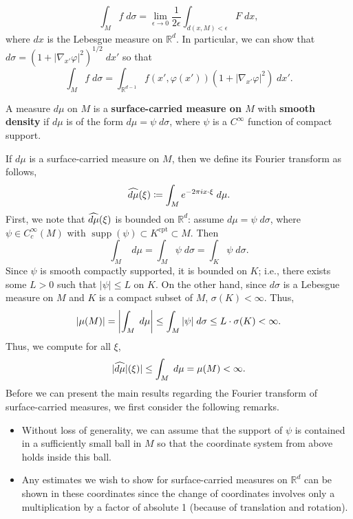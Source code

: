 \documentclass{article}
\begin{document}
\begin{equation*}
	\int_{M}f\;d\sigma= \lim_{\epsilon \to 0}\frac{1}{2\epsilon}\int_{d(x, M) < \epsilon}F\;dx, 
\end{equation*} 
where $dx$ is the Lebesgue measure on $\mathbb{R}^{d}$. In particular, we can show that $d\sigma = (1 + |\nabla_{x'}\varphi|^{2})^{1/2}\;dx'$ so that 
\begin{equation*}
	\int_{M}f\;d\sigma = \int_{\mathbb{R}^{d - 1}}f(x',\varphi(x'))(1 + |\nabla_{x'}\varphi|^{2})\;dx'. 
\end{equation*} 

\begin{definition}
	A measure $d\mu$ on $M$ is a \textbf{surface-carried measure on $M$} with \textbf{smooth density} if $d\mu$ is of the form $d\mu = \psi\;d\sigma$, where $\psi$ is a $C^{\infty}$ function of compact support. 
\end{definition} 
If $d\mu$ is a surface-carried measure on $M$, then we define its Fourier transform as follows, 
\begin{equation}
	\widehat{d\mu}(\xi) \coloneqq \int_{M}e^{-2\pi i x \cdot \xi}\;d\mu. 
\end{equation}
First, we note that $\widehat{d\mu}(\xi)$ is bounded on $\mathbb{R}^{d}$: assume $d\mu = \psi\;d\sigma$, where $\psi \in C^{\infty}_{c}(M)$ with $\operatorname{supp}(\psi) \subset K^{\text{cpt}} \subset M$. Then 
\begin{equation*}
\int_{M}\;d\mu = \int_{M}\psi\;d\sigma = \int_{K}\psi\;d\sigma. 
\end{equation*} 
Since $\psi$ is smooth compactly supported, it is bounded on $K$; i.e., there exists some $L > 0$ such that $|\psi| \leq L$ on $K$. On the other hand, since $d\sigma$ is a Lebesgue measure on $M$ and $K$ is a compact subset of $M$, $\sigma(K) < \infty$. Thus, 
\begin{equation*}
	|\mu(M)| = \left| \int_{M}\;d\mu \right| \leq \int_{M}|\psi|\;d\sigma \leq L \cdot \sigma(K) < \infty. 
\end{equation*}
Thus, we compute for all $\xi$, 
\begin{equation*}
	|\widehat{d\mu}|(\xi)| \leq \int_{M}\;d\mu = \mu(M) < \infty. 
\end{equation*}
Before we can present the main results regarding the Fourier transform of surface-carried measures, we first consider the following remarks. 
\begin{itemize}
	\item Without loss of generality, we can assume that the support of $\psi$ is contained in a sufficiently small ball in $M$ so that the coordinate system from above holds inside this ball. 
	\item Any estimates we wish to show for surface-carried measures on $\mathbb{R}^{d}$ can be shown in these coordinates since the change of coordinates involves only a multiplication by a factor of absolute 1 (because of translation and rotation). 
\end{itemize}
\end{document}
